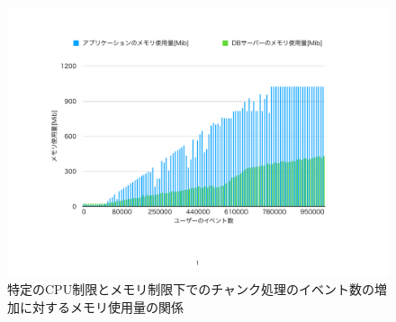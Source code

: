 \documentclass[../../../../../../main]{subfiles}
\begin{document}
    \begin{figure}[H]
        \centering
        \includegraphics[width=12cm]{graph}
        \caption{特定のCPU制限とメモリ制限下でのチャンク処理のイベント数の増加に対するメモリ使用量の関係}
        \label{fig:stream-memory-app_1_1024-db_1_1024}
    \end{figure}
\end{document}
